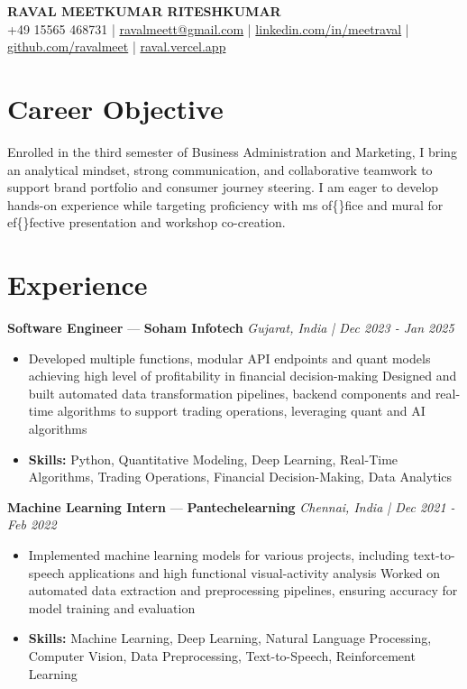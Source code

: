 \documentclass[a4paper,10pt]{article}
\begin{document}
\begin{center}
  {\Large\bfseries RAVAL MEETKUMAR RITESHKUMAR}\\[2pt]
  {\small +49 15565 468731 \;|\; \href{mailto:ravalmeett@gmail.com}{ravalmeett@gmail.com} \;|\; \href{https://www.linkedin.com/in/meetraval/}{linkedin.com/in/meetraval} \;|\; \href{https://github.com/ravalmeet}{github.com/ravalmeet} \;|\; \href{https://raval.vercel.app/}{raval.vercel.app}}
\end{center}
\vspace{-3pt}

\section*{Career Objective}
Enrolled in the third semester of Business Administration and Marketing, I bring an analytical mindset, strong communication, and collaborative teamwork to support brand portfolio and consumer journey steering. I am eager to develop hands-on experience while targeting proficiency with ms of\{\}fice and mural for ef\{\}fective presentation and workshop co-creation.\par

\section*{Experience}
\textbf{Software Engineer} — \textbf{Soham Infotech} \hfill \textit{Gujarat, India \;|\; Dec 2023 - Jan 2025}\par
\vspace{1pt}
\begin{itemize}
  \item Developed multiple functions, modular API endpoints and quant models achieving high level of profitability in financial decision-making Designed and built automated data transformation pipelines, backend components and real-time algorithms to support trading operations, leveraging quant and AI algorithms
  \item \textbf{Skills:} Python, Quantitative Modeling, Deep Learning, Real-Time Algorithms, Trading Operations, Financial Decision-Making, Data Analytics
\end{itemize}
\vspace{3pt}
\textbf{Machine Learning Intern} — \textbf{Pantechelearning} \hfill \textit{Chennai, India \;|\; Dec 2021 - Feb 2022}\par
\vspace{1pt}
\begin{itemize}
  \item Implemented machine learning models for various projects, including text-to-speech applications and high functional visual-activity analysis Worked on automated data extraction and preprocessing pipelines, ensuring accuracy for model training and evaluation
  \item \textbf{Skills:} Machine Learning, Deep Learning, Natural Language Processing, Computer Vision, Data Preprocessing, Text-to-Speech, Reinforcement Learning
\end{itemize}
\end{document}
